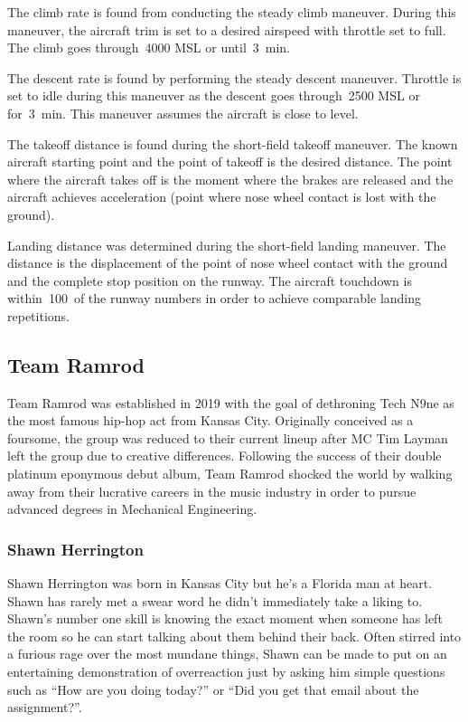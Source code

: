 \documentclass[conf]{new-aiaa}
\begin{document}
The climb rate is found from conducting the steady climb maneuver. During this maneuver, the aircraft trim is set to a desired airspeed with throttle set to full. The climb goes through~\SI{4000}{\foot} MSL or until~\SI{3}{\minute}. 

The descent rate is found by performing the steady descent maneuver. Throttle is set to idle during this maneuver as the descent goes through~\SI{2500}{\foot} MSL or for~\SI{3}{\minute}. This maneuver assumes the aircraft is close to level.

The takeoff distance is found during the short-field takeoff maneuver. The known aircraft starting point and the point of takeoff is the desired distance. The point where the aircraft takes off is the moment where the brakes are released and the aircraft achieves acceleration (point where nose wheel contact is lost with the ground). 

Landing distance was determined during the short-field landing maneuver. The distance is the displacement of the point of nose wheel contact with the ground and the complete stop position on the runway. The aircraft touchdown is within~\SI{100}{\foot}~of the runway numbers in order to achieve comparable landing repetitions.

\subsection{Team Ramrod}

Team Ramrod was established in 2019 with the goal of dethroning Tech N9ne as the most famous hip-hop act from Kansas City. Originally conceived as a foursome, the group was reduced to their current lineup after MC Tim Layman left the group due to creative differences. Following the success of their double platinum eponymous debut album, Team Ramrod shocked the world by walking away from their lucrative careers in the music industry in order to pursue advanced degrees in Mechanical Engineering.

\subsubsection{Shawn Herrington}

Shawn Herrington was born in Kansas City but he's a Florida man at heart. Shawn has rarely met a swear word he didn't immediately take a liking to. Shawn's number one skill is knowing the exact moment when someone has left the room so he can start talking about them behind their back. Often stirred into a furious rage over the most mundane things, Shawn can be made to put on an entertaining demonstration of overreaction just by asking him simple questions such as ``How are you doing today?'' or ``Did you get that email about the assignment?''.
\end{document}
